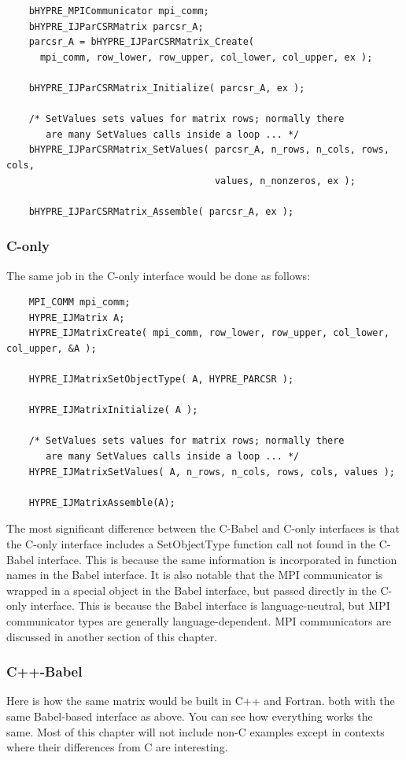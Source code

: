 \begin{verbatim}
    bHYPRE_MPICommunicator mpi_comm;
    bHYPRE_IJParCSRMatrix parcsr_A;
    parcsr_A = bHYPRE_IJParCSRMatrix_Create(
      mpi_comm, row_lower, row_upper, col_lower, col_upper, ex );

    bHYPRE_IJParCSRMatrix_Initialize( parcsr_A, ex );

    /* SetValues sets values for matrix rows; normally there
       are many SetValues calls inside a loop ... */
    bHYPRE_IJParCSRMatrix_SetValues( parcsr_A, n_rows, n_cols, rows, cols,
                                     values, n_nonzeros, ex );

    bHYPRE_IJParCSRMatrix_Assemble( parcsr_A, ex );
\end{verbatim}

\subsubsection{C-only}
The same job in the C-only interface would be done as follows:

\begin{verbatim}
    MPI_COMM mpi_comm;
    HYPRE_IJMatrix A;
    HYPRE_IJMatrixCreate( mpi_comm, row_lower, row_upper, col_lower, col_upper, &A );

    HYPRE_IJMatrixSetObjectType( A, HYPRE_PARCSR );

    HYPRE_IJMatrixInitialize( A );

    /* SetValues sets values for matrix rows; normally there
       are many SetValues calls inside a loop ... */
    HYPRE_IJMatrixSetValues( A, n_rows, n_cols, rows, cols, values );

    HYPRE_IJMatrixAssemble(A);
\end{verbatim}


The most significant difference between the C-Babel and C-only
interfaces is that the C-only interface includes a SetObjectType
function call not found in the C-Babel interface.  This is because the
same information is incorporated in function names in the Babel
interface.  It is also notable that the MPI communicator is wrapped in
a special object in the Babel interface, but passed directly in the
C-only interface.  This is because the Babel interface is
language-neutral, but MPI communicator types are generally
language-dependent.  MPI communicators are discussed in another
section of this chapter.

\subsubsection{C++-Babel}
Here is how the same matrix would be built in C++ and Fortran.
both with the same Babel-based interface as above.
You can see how everything works the same.  Most of this chapter
will not include non-C examples except in contexts where their differences
from C are interesting.

